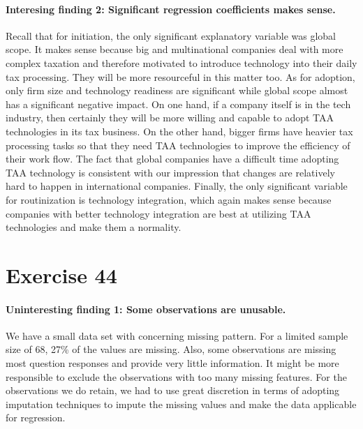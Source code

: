\documentclass[12pt, letterpaper]{article}
\begin{document}
\paragraph{Interesing finding 2: Significant regression coefficients makes sense.}
Recall that for initiation, the only significant explanatory variable was global scope. It makes sense because big and multinational companies deal with more complex taxation and therefore motivated to introduce technology into their daily tax processing. They will be more resourceful in this matter too. As for adoption, only firm size and technology readiness are significant while global scope almost has a significant negative impact. On one hand, if a company itself is in the tech industry, then certainly they will be more willing and capable to adopt TAA technologies in its tax business. On the other hand, bigger firms have heavier tax processing tasks so that they need TAA technologies to improve the efficiency of their work flow. The fact that global companies have a difficult time adopting TAA technology is consistent with our impression that changes are relatively hard to happen in international companies. Finally, the only significant variable for routinization is technology integration, which again makes sense because companies with better technology integration are best at utilizing TAA technologies and make them a normality.

\section{Exercise 44}
\paragraph{Uninteresting finding 1: Some observations are unusable.}
We have a small data set with concerning missing pattern. For a limited sample size of 68, 27\% of the values are missing. Also, some observations are missing most question responses and provide very little information. It might be more responsible to exclude the observations with too many missing features. For the observations we do retain, we had to use great discretion in terms of adopting imputation techniques to impute the missing values and make the data applicable for regression. 
\end{document}
